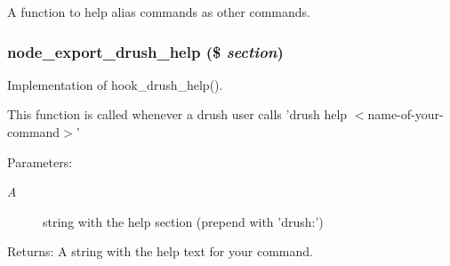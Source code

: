 A function to help alias commands as other commands. \hypertarget{node__export_8drush_8inc_0724e4b804b130347ce440da8d774b59}{
\subsubsection[{node\_\-export\_\-drush\_\-help}]{\setlength{\rightskip}{0pt plus 5cm}node\_\-export\_\-drush\_\-help (\$ {\em section})}}
\label{node__export_8drush_8inc_0724e4b804b130347ce440da8d774b59}


Implementation of hook\_\-drush\_\-help().

This function is called whenever a drush user calls 'drush help $<$name-of-your-command$>$'

\begin{Desc}
\item[Parameters:]
\begin{description}
\item[{\em A}]string with the help section (prepend with 'drush:')\end{description}
\end{Desc}
\begin{Desc}
\item[Returns:]A string with the help text for your command. \end{Desc}
